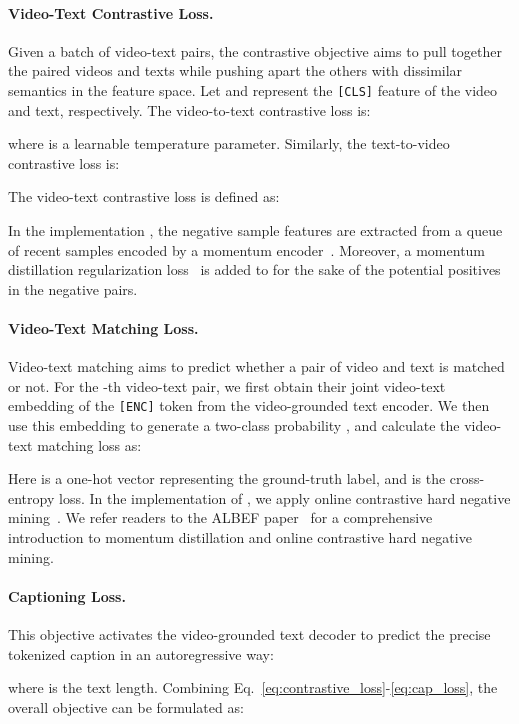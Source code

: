 \documentclass[11pt]{article}
\begin{document}
\paragraph{Video-Text Contrastive Loss.}
Given a batch of  video-text pairs, the contrastive objective aims to pull together the paired videos and texts while pushing apart the others with dissimilar semantics in the feature space. 
Let  and  represent the \texttt{[CLS]} feature of the video and text, respectively. The video-to-text contrastive loss  is:

where   is a learnable temperature parameter. Similarly, the text-to-video contrastive loss
 is:

The video-text contrastive loss is defined as:

In the implementation , the negative sample features are extracted from a queue of recent samples encoded by a momentum  encoder~\citep{he2020momentum}.
Moreover, a momentum distillation regularization loss~\citep{Li2021AlignBF} is added to  for the sake of the potential positives in the negative pairs.

\paragraph{Video-Text Matching Loss.}
Video-text matching aims to predict whether a pair of video and text is matched or not. 
For the -th video-text pair, 
we first obtain their joint video-text embedding of the \texttt{[ENC]} token from the video-grounded text encoder. 
We then use this embedding to generate a two-class probability , and calculate the video-text matching loss  as:

Here  is a one-hot vector representing the ground-truth label, and  is the cross-entropy loss. 
In the implementation of , we apply online contrastive hard negative mining~\citep{Li2021AlignBF}.
We refer readers to the ALBEF paper~\citep{Li2021AlignBF} for a comprehensive introduction to momentum distillation and  online contrastive hard negative mining.

\paragraph{Captioning Loss.} This objective activates the video-grounded text decoder to predict the precise tokenized caption  in an autoregressive way:

where  is the text length. 
Combining Eq.~\eqref{eq:contrastive_loss}-\eqref{eq:cap_loss}, the overall objective can be formulated as: 
\end{document}
